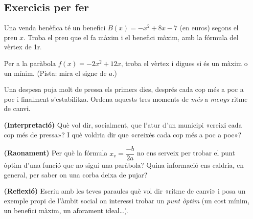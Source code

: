 \subsection{Exercicis per fer}

\begin{exercicis}
\begin{exlist}
  \item Una venda benèfica té un benefici $B(x)=-x^2+8x-7$ (en euros) segons el preu
        $x$. Troba el preu que el fa màxim i el benefici màxim, amb la fórmula del
        vèrtex de 1r.
  \item Per a la paràbola $f(x)=-2x^2+12x$, troba el vèrtex i digues si és un màxim o
        un mínim. (Pista: mira el signe de $a$.)
  \item Una despesa puja molt de pressa els primers dies, després cada cop més a poc a
        poc i finalment s'estabilitza. Ordena aquests tres moments de \emph{més} a
        \emph{menys} ritme de canvi.
  \item \textbf{(Interpretació)} Què vol dir, socialment, que l'atur d'un municipi
        «creixi cada cop més de pressa»? I què voldria dir que «creixés cada cop més a
        poc a poc»?
  \item \textbf{(Raonament)} Per què la fórmula $x_v=\dfrac{-b}{2a}$ no ens serveix per
        trobar el punt òptim d'una funció que no sigui una paràbola? Quina informació
        ens caldria, en general, per saber on una corba deixa de pujar?
  \item \textbf{(Reflexió)} Escriu amb les teves paraules què vol dir «ritme de canvi»
        i posa un exemple propi de l'àmbit social on interessi trobar un \emph{punt
        òptim} (un cost mínim, un benefici màxim, un aforament ideal\ldots).
\end{exlist}
\end{exercicis}

